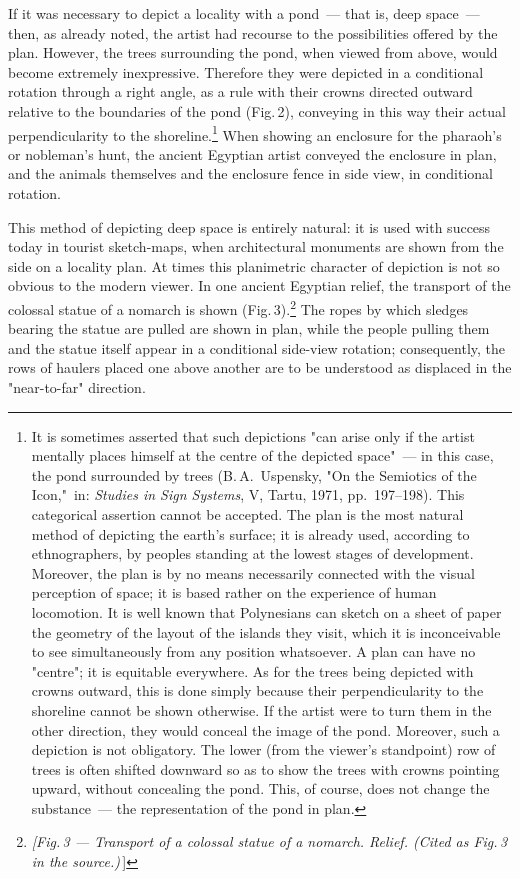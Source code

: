 If it was necessary to depict a locality with a pond~--- that is, deep space~--- then, as
already noted, the artist had recourse to the possibilities offered by the plan. However,
the trees surrounding the pond, when viewed from above, would become extremely
inexpressive. Therefore they were depicted in a conditional rotation through a right
angle, as a rule with their crowns directed outward relative to the boundaries of the
pond (Fig.\,2), conveying in this way their actual perpendicularity to the shoreline.\footnote{%
  It is sometimes asserted that such depictions "can arise only if the artist mentally
  places himself at the centre of the depicted space"~--- in this case, the pond surrounded
  by trees (B.\,A.~Uspensky, "On the Semiotics of the Icon,"~in: \textit{Studies in Sign
  Systems}, V, Tartu, 1971, pp.~197--198). This categorical assertion cannot be
  accepted. The plan is the most natural method of depicting the earth's surface; it is
  already used, according to ethnographers, by peoples standing at the lowest stages of
  development. Moreover, the plan is by no means necessarily connected with the visual
  perception of space; it is based rather on the experience of human locomotion. It is
  well known that Polynesians can sketch on a sheet of paper the geometry of the layout
  of the islands they visit, which it is inconceivable to see simultaneously from any
  position whatsoever. A plan can have no "centre"; it is equitable everywhere.
  As for the trees being depicted with crowns outward, this is done simply because
  their perpendicularity to the shoreline cannot be shown otherwise. If the artist were
  to turn them in the other direction, they would conceal the image of the pond.
  Moreover, such a depiction is not obligatory. The lower (from the viewer's
  standpoint) row of trees is often shifted downward so as to show the trees with
  crowns pointing upward, without concealing the pond. This, of course, does not
  change the substance~--- the representation of the pond in plan.}
When showing an enclosure for the pharaoh's or nobleman's hunt, the ancient Egyptian
artist conveyed the enclosure in plan, and the animals themselves and the enclosure
fence in side view, in conditional rotation.

This method of depicting deep space is entirely natural: it is used with success today
in tourist sketch-maps, when architectural monuments are shown from the side on a
locality plan. At times this planimetric character of depiction is not so obvious to the
modern viewer. In one ancient Egyptian relief, the transport of the colossal statue of a
nomarch is shown (Fig.\,3).\footnote{%
  \textit{[Fig.\,3 — Transport of a colossal statue of a nomarch.
  Relief. (Cited as Fig.\,3 in the source.)}\,]}
The ropes by which sledges bearing the statue are pulled are shown in plan, while the
people pulling them and the statue itself appear in a conditional side-view rotation;
consequently, the rows of haulers placed one above another are to be understood as
displaced in the "near-to-far" direction.

